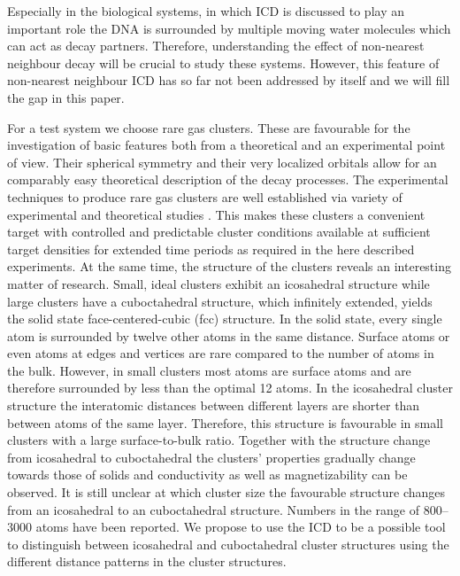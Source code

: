 Especially in the biological systems, in which ICD is discussed to play an
important role \cite{Alizadeh15,Gokhberg14,Trinter14}
the DNA is surrounded by multiple moving
water molecules which can act as decay partners. Therefore, understanding the
effect of non-nearest neighbour decay will be crucial to study these systems.
However, this feature of non-nearest neighbour ICD
has so far not been addressed by itself and we will fill the gap in this
paper.

For a test system we choose rare gas clusters. These are favourable
for the investigation of basic features both
from a theoretical and an experimental point of view. Their spherical
symmetry and their very localized orbitals allow for an comparably easy
theoretical description of the decay processes.
The experimental techniques to produce rare gas clusters are well established
via variety of experimental and theoretical studies
\cite{Hagena72,Hagena81,Hagena87,Ohrwall04}. This makes these clusters a convenient target with controlled and predictable cluster conditions available at sufficient target densities for extended time periods as required in the here described experiments.
At the same time, the structure of the clusters reveals an
interesting matter of research. Small, ideal clusters exhibit an icosahedral
structure while large clusters have a cuboctahedral structure, which
infinitely extended, yields the solid state face-centered-cubic (fcc) structure.
In the solid state, every single atom is surrounded by twelve other atoms in the
same distance. Surface atoms or even atoms at edges and vertices are rare
compared to the number of atoms in the bulk. 
However, in small clusters most atoms are surface atoms and are therefore
surrounded by less than the optimal 12 atoms.
In the icosahedral cluster structure the interatomic distances between different
layers are shorter than between atoms of the same layer. 
Therefore,
this structure is favourable in small clusters with a large surface-to-bulk ratio.
Together with the structure change from icosahedral to cuboctahedral
the clusters' properties gradually change towards those of solids and
conductivity as well as magnetizability can be observed. \cite{Benfield92}
It is still unclear at which cluster size the favourable structure changes from
an icosahedral to an cuboctahedral structure. Numbers in the range
of 800--3000 atoms have been reported. \cite{Hartke02,Pahl08}
We propose to use the ICD to be a possible tool to distinguish between
icosahedral and cuboctahedral cluster structures using the different distance
patterns in the cluster structures.

